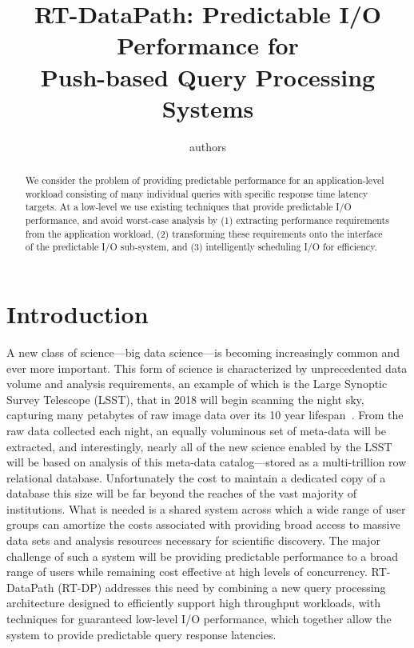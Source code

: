 \documentclass{sig-alternate}
\title{RT-DataPath: Predictable I/O Performance for\\ Push-based Query Processing
Systems}
\author{authors}
\begin{document}
\maketitle

\begin{abstract}
We consider the problem of providing predictable performance for an
application-level workload consisting of many individual queries with specific
response time latency targets. At a low-level we use existing techniques that
provide predictable I/O performance, and avoid worst-case analysis by (1)
extracting performance requirements from the application workload, (2)
transforming these requirements onto the interface of the predictable I/O
sub-system, and (3) intelligently scheduling I/O for efficiency.
\end{abstract}

\section{Introduction}
\label{sec:intro}


A new class of science---big data science---is becoming increasingly common
and ever more important. This form of science is characterized by
unprecedented data volume and analysis requirements, an example of which is
the Large Synoptic Survey Telescope (LSST), that in 2018 will begin scanning
the night sky, capturing many petabytes of raw image data over its 10 year
lifespan~\cite{ivezic:arxiv11}. From the raw data collected each night, an
equally voluminous set of meta-data will be extracted, and interestingly,
nearly all of the new science enabled by the LSST will be based on analysis of
this meta-data catalog---stored as a multi-trillion row relational database.
Unfortunately the cost to maintain a dedicated copy of a database this size
will be far beyond the reaches of the vast majority of institutions. What is
needed is a shared system across which a wide range of user groups can
amortize the costs associated with providing broad access to massive data sets
and analysis resources necessary for scientific discovery. The major challenge
of such a system will be providing predictable performance to a broad range of
users while remaining cost effective at high levels of concurrency.
RT-DataPath (RT-DP) addresses this need by combining a new query processing
architecture designed to efficiently support high throughput workloads, with
techniques for guaranteed low-level I/O performance, which together allow the
system to provide predictable query response latencies.
\end{document}
